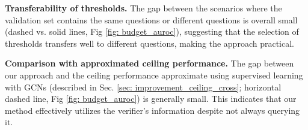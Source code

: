 \textbf{Transferability of thresholds.} The gap between the scenarios where the validation set contains the same questions or different questions is overall small (dashed vs. solid lines, Fig \ref{fig: budget_auroc}), suggesting that the selection of thresholds transfers well to different questions, making the approach practical.


\textbf{Comparison with approximated ceiling performance.} {The gap between our approach and the ceiling performance  approximate using supervised learning with GCNs (described in Sec. \ref{sec: improvement_ceiling_cross}; horizontal dashed line, Fig \ref{fig: budget_auroc}) is generally small.} This indicates that our method effectively utilizes the verifier's information despite not always querying it.
